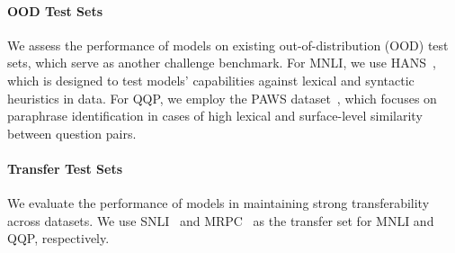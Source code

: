 \paragraph{OOD Test Sets} We assess the performance of models on existing out-of-distribution (OOD) test sets, which serve as another challenge benchmark. For MNLI, we use HANS~\citep{mccoy-etal-2019-right}, which is designed to test models' capabilities against lexical and syntactic heuristics in data. For QQP, we employ the PAWS dataset~\citep{zhang-etal-2019-paws}, which focuses on paraphrase identification in cases of high lexical and surface-level similarity between question pairs.

\paragraph{Transfer Test Sets} We evaluate the performance of models in maintaining strong transferability across datasets. We use SNLI~\citep{bowman-etal-2015-large} and MRPC~\citep{dolan-brockett-2005-automatically} as the transfer set for MNLI and QQP, respectively. 

